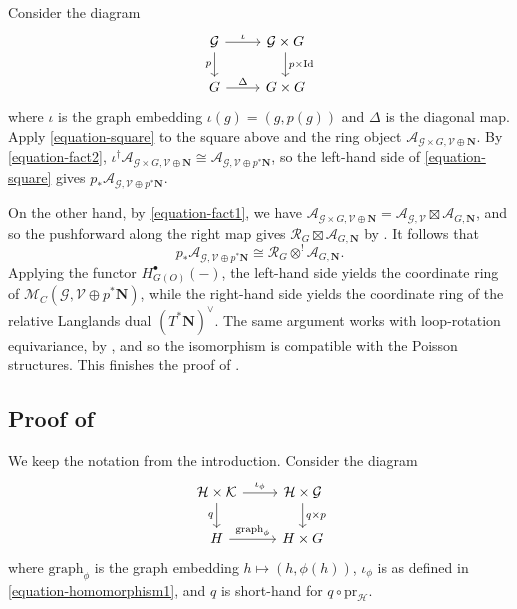 \documentclass[11pt]{amsart}
\theoremstyle{definition}
\theoremstyle{plain}
\theoremstyle{remark}
\DeclareMathOperator{\id}{Id}
\begin{document}
    Consider the diagram
    \[
        \begin{tikzcd}
            \mathcal{G} \arrow[r, "\iota"]\arrow[d, "p"'] & \mathcal{G} \times G \arrow[d, "p \times \id"] \\
            G \arrow[r, "\Delta"] & G \times G
        \end{tikzcd}
    \]
    where $\iota$ is the graph embedding $\iota(g)=(g,p(g))$ and $\Delta$ is the diagonal map. Apply \eqref{equation-square} to the square above and the ring object $\mathcal{A}_{\mathcal{G} \times G,\mathcal{V} \oplus \mathbf{N}}$. By \eqref{equation-fact2}, $\iota^\dagger\mathcal{A}_{\mathcal{G} \times G,\mathcal{V} \oplus \mathbf{N}} \cong \mathcal{A}_{\mathcal{G},\mathcal{V} \oplus p^*\mathbf{N}}$, so the left-hand side of \eqref{equation-square} gives $p_*\mathcal{A}_{\mathcal{G},\mathcal{V} \oplus p^*\mathbf{N}}$.
    
    On the other hand, by \eqref{equation-fact1}, we have $\mathcal{A}_{\mathcal{G} \times G,\mathcal{V} \oplus \mathbf{N}} = \mathcal{A}_{\mathcal{G},\mathcal{V}} \boxtimes \mathcal{A}_{G,\mathbf{N}}$, and so the pushforward along the right map gives $\mathcal{R}_{G} \boxtimes \mathcal{A}_{G,\mathbf{N}}$ by . It follows that
    \begin{equation}\label{equation-final1}
        p_*\mathcal{A}_{\mathcal{G},\mathcal{V} \oplus p^*\mathbf{N}} \cong \mathcal{R}_{G} \otimes^! \mathcal{A}_{G,\mathbf{N}}.
    \end{equation}
    Applying the functor $H_{G(O)}^\bullet(-)$, the left-hand side yields the coordinate ring of $\mathcal{M}_C(\mathcal{G}, \mathcal{V} \oplus p^*\mathbf{N})$, while the right-hand side yields the coordinate ring of the relative Langlands dual $(T^*\mathbf{N})^\vee$. The same argument works with loop-rotation equivariance, by \cite[Proposition 3.3]{GannonWilliams2026}, and so the isomorphism is compatible with the Poisson structures. This finishes the proof of .

    \subsection{Proof of \texorpdfstring{}{Theorem 1.2}}

    We keep the notation from the introduction. Consider the diagram
    \[
        \begin{tikzcd}
            \mathcal{H} \times \mathcal{K} \arrow[r, "\iota_\phi"]\arrow[d, "q"'] & \mathcal{H} \times \mathcal{G} \arrow[d, "q \times p"] \\
            H \arrow[r, "\mathrm{graph}_{\phi}"] & H \times G
        \end{tikzcd}
    \]
    where $\mathrm{graph}_{\phi}$ is the graph embedding $h \mapsto (h,\phi(h))$, $\iota_\phi$ is as defined in \eqref{equation-homomorphism1}, and $q$ is short-hand for $q \circ \mathrm{pr}_{\mathcal{H}}$.
\end{document}
